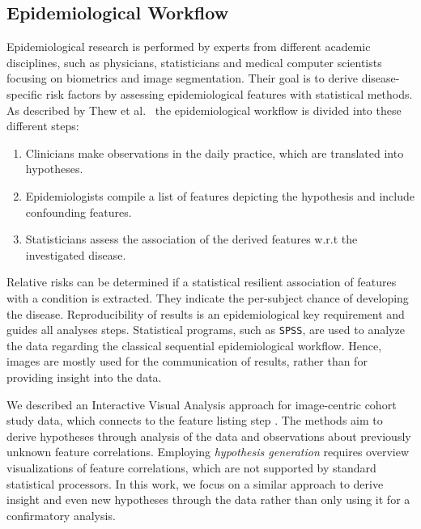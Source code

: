 \documentclass[journal]{style/vgtc} 			          %
\begin{document}
\subsection{Epidemiological Workflow} \label{sec:EpidemiologicalWorkflow}
Epidemiological research is performed by experts from different academic disciplines, such as physicians, statisticians and medical computer scientists focusing on biometrics and image segmentation.
Their goal is to derive disease-specific risk factors by assessing epidemiological features with statistical methods.
As described by Thew et al.~\cite{Thew2009} the epidemiological workflow is divided into these different steps:
\begin{enumerate}
	\item Clinicians make observations in the daily practice, which are translated into hypotheses.
	\item Epidemiologists compile a list of features depicting the hypothesis and include confounding features.
	\item Statisticians assess the association of the derived features w.r.t the investigated disease.
\end{enumerate}
Relative risks can be determined if a statistical resilient association of features with a condition is extracted.
They indicate the per-subject chance of developing the disease.
Reproducibility of results is an epidemiological key requirement and guides all analyses steps.
Statistical programs, such as \texttt{SPSS}, are used to analyze the data regarding the classical sequential epidemiological workflow.
Hence, images are mostly used for the communication of results, rather than for providing insight into the data.

We described an Interactive Visual Analysis approach for image-centric cohort study data, which connects to the feature listing step \cite{Klemm2014VIS}.
The methods aim to derive hypotheses through analysis of the data and observations about previously unknown feature correlations.
Employing \emph{hypothesis generation} requires overview visualizations of feature correlations, which are not supported by standard statistical processors.
In this work, we focus on a similar approach to derive insight and even new hypotheses through the data rather than only using it for a confirmatory analysis.
\end{document}
